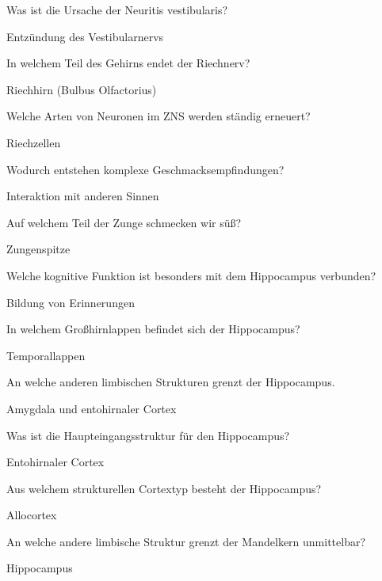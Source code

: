 \documentclass[10pt, a4paper]{exam}
\begin{document}
\begin{questions}
  \question Was ist die Ursache der Neuritis vestibularis?
  \begin{solution}
    Entzündung des Vestibularnervs
  \end{solution}

  \question In welchem Teil des Gehirns endet der Riechnerv?
  \begin{solution}
    Riechhirn (Bulbus Olfactorius)
  \end{solution}

  \question Welche Arten von Neuronen im ZNS werden ständig erneuert?
  \begin{solution}
    Riechzellen
  \end{solution}

  \question Wodurch entstehen komplexe Geschmacksempfindungen?
  \begin{solution}
    Interaktion mit anderen Sinnen
  \end{solution}

  \question Auf welchem Teil der Zunge schmecken wir süß?
  \begin{solution}
    Zungenspitze
  \end{solution}

  \question Welche kognitive Funktion ist besonders mit dem Hippocampus verbunden?
  \begin{solution}
    Bildung von Erinnerungen
  \end{solution}

  \question In welchem Großhirnlappen befindet sich der Hippocampus?
  \begin{solution}
    Temporallappen
  \end{solution}

  \question An welche anderen limbischen Strukturen grenzt der Hippocampus.
  \begin{solution}
    Amygdala und entohirnaler Cortex
  \end{solution}

  \question Was ist die Haupteingangsstruktur für den Hippocampus?
  \begin{solution}
    Entohirnaler Cortex
  \end{solution}

  \question Aus welchem strukturellen Cortextyp besteht der Hippocampus?
  \begin{solution}
    Allocortex
  \end{solution}

  \question An welche andere limbische Struktur grenzt der Mandelkern unmittelbar?
  \begin{solution}
    Hippocampus
  \end{solution}


\end{questions}
\end{document}
